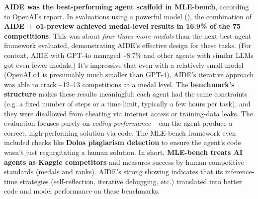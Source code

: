 \textbf{AIDE was the best-performing agent scaffold in MLE-bench}, according to OpenAI’s report. In evaluations using a powerful model (\cite{oai_o1preview}), the combination of \textbf{AIDE + o1-preview achieved medal-level results in 16.9\% of the 75 competitions}. This was about \textit{four times more medals} than the next-best agent framework evaluated, demonstrating AIDE’s effective design for these tasks. (For context, AIDE with GPT-4o managed \textasciitilde{}8.7\% and other agents with similar LLMs got even fewer medals.) It’s impressive that even with a relatively small model (OpenAI o1 is presumably much smaller than GPT-4), AIDE’s iterative approach was able to crack \textasciitilde{}12–13 competitions at a medal level. The \textbf{benchmark’s structure} makes these results meaningful: each agent had the same constraints (e.g. a fixed number of steps or a time limit, typically a few hours per task), and they were disallowed from cheating via internet access or training-data leaks. The evaluation focuses purely on \textit{coding performance} – can the agent produce a correct, high-performing solution via code. The MLE-bench framework even included checks like \textbf{Dolos plagiarism detection} \cite{dolos} to ensure the agent’s code wasn’t just regurgitating a human solution. In short, \textbf{MLE-bench treats AI agents as Kaggle competitors} and measures success by human-competitive standards (medals and ranks). AIDE’s strong showing indicates that its inference-time strategies (self-reflection, iterative debugging, etc.) translated into better code and model performance on these benchmarks.

